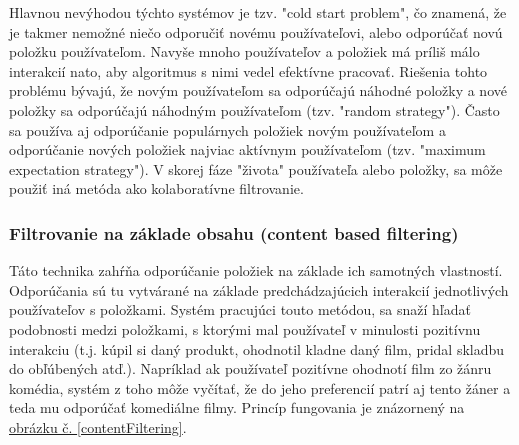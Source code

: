 Hlavnou nevýhodou týchto systémov je tzv. "cold start problem", čo znamená, že je takmer nemožné niečo odporučiť novému používateľovi, alebo odporúčať novú položku používateľom. Navyše mnoho používateľov a položiek má príliš málo interakcií nato, aby algoritmus s nimi vedel efektívne pracovať. Riešenia tohto problému bývajú, že novým používateľom sa odporúčajú náhodné položky a nové položky sa odporúčajú náhodným používateľom (tzv. "random strategy"). Často sa používa aj odporúčanie populárnych položiek novým používateľom a odporúčanie nových položiek najviac aktívnym používateľom (tzv. "maximum expectation strategy"). V skorej fáze "života" používateľa alebo položky, sa môže použiť iná metóda ako kolaboratívne filtrovanie. \cite{rs2} \\
	
 
\subsubsection{Filtrovanie na základe obsahu (content based filtering)}
\label{sec:contentbased}
Táto technika zahŕňa odporúčanie položiek na základe ich samotných vlastností. \cite{rs3} Odporúčania sú tu vytvárané na základe predchádzajúcich interakcií jednotlivých používateľov s položkami. Systém pracujúci touto metódou, sa snaží hľadať podobnosti medzi položkami, s ktorými mal používateľ v minulosti pozitívnu interakciu (t.j. kúpil si daný produkt, ohodnotil kladne daný film, pridal skladbu do obľúbených atď.). Napríklad ak používateľ pozitívne ohodnotí film zo žánru komédia, systém z toho môže vyčítať, že do jeho preferencií patrí aj tento žáner a teda mu odporúčať komediálne filmy. \cite{rs1} Princíp fungovania je znázornený na \hyperref[contentFiltering]{obrázku č. \ref{contentFiltering}}.

